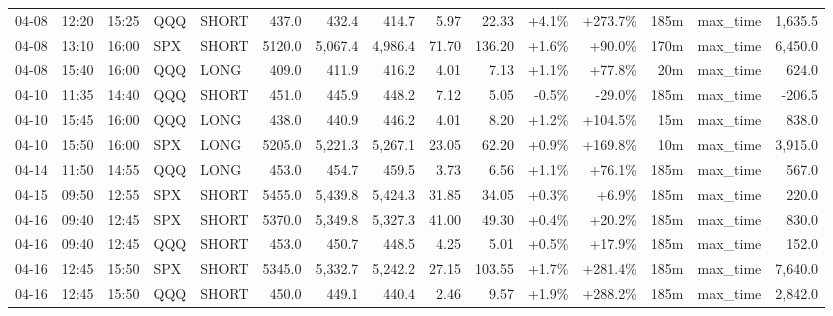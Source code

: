 \documentclass[11pt,a4paper,twoside]{article}
\begin{document}
\begin{landscape}
\begin{center}
\begin{longtable}{>{\color{txtmain}}l l l l l r r r r r r r r >{\color{txtmain}}l r}
04-08 & 12:20 & 15:25 & QQQ & SHORT & 437.0 & 432.4 & 414.7 & 5.97 & 22.33 & \textcolor{wingreen}{+4.1\%} & \textcolor{wingreen}{+273.7\%} & 185m & max\_time & \textcolor{wingreen}{1,635.5} \\
04-08 & 13:10 & 16:00 & SPX & SHORT & 5120.0 & 5,067.4 & 4,986.4 & 71.70 & 136.20 & \textcolor{wingreen}{+1.6\%} & \textcolor{wingreen}{+90.0\%} & 170m & max\_time & \textcolor{wingreen}{6,450.0} \\
04-08 & 15:40 & 16:00 & QQQ & LONG & 409.0 & 411.9 & 416.2 & 4.01 & 7.13 & \textcolor{wingreen}{+1.1\%} & \textcolor{wingreen}{+77.8\%} & 20m & max\_time & \textcolor{wingreen}{624.0} \\
04-10 & 11:35 & 14:40 & QQQ & SHORT & 451.0 & 445.9 & 448.2 & 7.12 & 5.05 & \textcolor{lossred}{-0.5\%} & \textcolor{lossred}{-29.0\%} & 185m & max\_time & \textcolor{lossred}{-206.5} \\
04-10 & 15:45 & 16:00 & QQQ & LONG & 438.0 & 440.9 & 446.2 & 4.01 & 8.20 & \textcolor{wingreen}{+1.2\%} & \textcolor{wingreen}{+104.5\%} & 15m & max\_time & \textcolor{wingreen}{838.0} \\
04-10 & 15:50 & 16:00 & SPX & LONG & 5205.0 & 5,221.3 & 5,267.1 & 23.05 & 62.20 & \textcolor{wingreen}{+0.9\%} & \textcolor{wingreen}{+169.8\%} & 10m & max\_time & \textcolor{wingreen}{3,915.0} \\
04-14 & 11:50 & 14:55 & QQQ & LONG & 453.0 & 454.7 & 459.5 & 3.73 & 6.56 & \textcolor{wingreen}{+1.1\%} & \textcolor{wingreen}{+76.1\%} & 185m & max\_time & \textcolor{wingreen}{567.0} \\
04-15 & 09:50 & 12:55 & SPX & SHORT & 5455.0 & 5,439.8 & 5,424.3 & 31.85 & 34.05 & \textcolor{wingreen}{+0.3\%} & \textcolor{wingreen}{+6.9\%} & 185m & max\_time & \textcolor{wingreen}{220.0} \\
04-16 & 09:40 & 12:45 & SPX & SHORT & 5370.0 & 5,349.8 & 5,327.3 & 41.00 & 49.30 & \textcolor{wingreen}{+0.4\%} & \textcolor{wingreen}{+20.2\%} & 185m & max\_time & \textcolor{wingreen}{830.0} \\
04-16 & 09:40 & 12:45 & QQQ & SHORT & 453.0 & 450.7 & 448.5 & 4.25 & 5.01 & \textcolor{wingreen}{+0.5\%} & \textcolor{wingreen}{+17.9\%} & 185m & max\_time & \textcolor{wingreen}{152.0} \\
04-16 & 12:45 & 15:50 & SPX & SHORT & 5345.0 & 5,332.7 & 5,242.2 & 27.15 & 103.55 & \textcolor{wingreen}{+1.7\%} & \textcolor{wingreen}{+281.4\%} & 185m & max\_time & \textcolor{wingreen}{7,640.0} \\
04-16 & 12:45 & 15:50 & QQQ & SHORT & 450.0 & 449.1 & 440.4 & 2.46 & 9.57 & \textcolor{wingreen}{+1.9\%} & \textcolor{wingreen}{+288.2\%} & 185m & max\_time & \textcolor{wingreen}{2,842.0} \\

\end{longtable}
\end{center}
\end{landscape}
\end{document}
